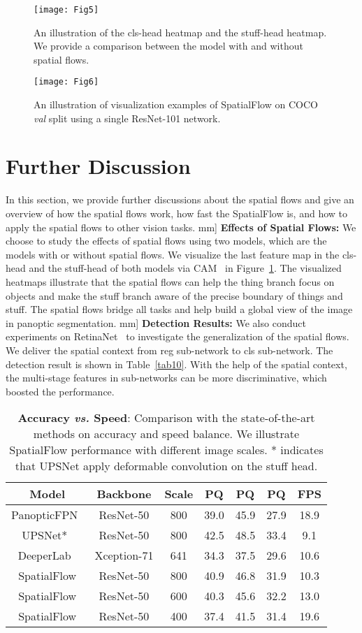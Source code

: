 \documentclass[journal,final]{IEEEtran}
\begin{document}
\begin{figure}
  \centering
  \texttt{[image: Fig5]}
  \caption{An illustration of the cls-head heatmap and the stuff-head heatmap. We provide a comparison between the model with and without spatial flows.}
   \label{fig4}
\end{figure}
\begin{figure*}
  \centering
  \texttt{[image: Fig6]}
   \caption{An illustration of visualization examples of SpatialFlow on COCO {\em val} split using a single ResNet-101 network.}
   \label{fig5}
\end{figure*}
\section{Further Discussion} \label{sec5}
In this section, we provide further discussions about the spatial flows and give an overview of how the spatial flows work, how fast the SpatialFlow is, and how to apply the spatial flows to other vision tasks.
\3mm]
\textbf{Effects of Spatial Flows:} We choose to study the effects of spatial flows using two models, which are the models with or without spatial flows. We visualize the last feature map in the cls-head and the stuff-head of both models via CAM~\cite{cam} in Figure~\ref{fig4}. The visualized heatmaps illustrate that the spatial flows can help the thing branch focus on objects and make the stuff branch aware of the precise boundary of things and stuff. The spatial flows bridge all tasks and help build a global view of the image in panoptic segmentation.
\3mm]
\textbf{Detection Results:}  We also conduct experiments on RetinaNet~\cite{retinanet} to investigate the generalization of the spatial flows. We deliver the spatial context from reg sub-network to cls sub-network.  The detection result is shown in Table~\ref{tab10}. With the help of the spatial context, the multi-stage features in sub-networks can be more discriminative, which boosted the performance.
\begin{table}
  \centering
  \caption{\textbf{Accuracy {\em vs.} Speed}: Comparison with the state-of-the-art methods on accuracy and speed balance. We illustrate SpatialFlow performance with different image scales. * indicates that UPSNet apply deformable convolution on the stuff head.}
  \label{tab9}
  \begin{tabular}{ccccccc}
    \toprule
    Model & Backbone & Scale & PQ & PQ & PQ & FPS\\
    \midrule
    \midrule
    PanopticFPN~\cite{panopticfpn} & ResNet-50 & 800 & 39.0 & 45.9 & 27.9 & 18.9 \\
    UPSNet*~\cite{upsnet} & ResNet-50 & 800 & 42.5 & 48.5 & 33.4 & 9.1 \\
    DeeperLab~\cite{deeperlab} & Xception-71 & 641 & 34.3 & 37.5 & 29.6 & 10.6 \\
    \midrule
    SpatialFlow & ResNet-50 & 800 & 40.9 & 46.8 & 31.9 & 10.3\\
    SpatialFlow & ResNet-50 & 600 & 40.3 & 45.6 & 32.2 & 13.0\\
    SpatialFlow & ResNet-50 & 400 & 37.4 & 41.5 & 31.4 & 19.6\\
    \bottomrule
  \end{tabular}
\end{table}
\end{document}
